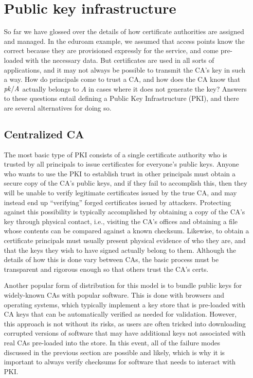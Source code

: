 \documentclass[11pt]{article}
\begin{document}
\section{Public key infrastructure}

So far we have glossed over the details of how certificate authorities
are assigned and managed. In the eduroam example, we assumed that
access points know the correct  because they are
provisioned expressly for the service, and come pre-loaded with the
necessary data. But certificates are used in all sorts of
applications, and it may not always be possible to transmit the CA's
key in such a way. How do principals come to trust a CA, and how does
the CA know that $\mathit{pk/A}$ actually belongs to $A$ in cases where it
does not generate the key? Answers to these questions entail defining
a Public Key Infrastructure (PKI), and there are several
alternatives for doing so.

\subsection{Centralized CA}

The most basic type of PKI consists of a single certificate authority
who is trusted by all principals to issue certificates for everyone's
public keys. Anyone who wants to use the PKI to establish trust in
other principals must obtain a secure copy of the CA's public keys,
and if they fail to accomplish this, then they will be unable to
verify legitimate certificates issued by the true CA, and may instead
end up ``verifying'' forged certificates issued by attackers.
Protecting against this possibility is typically accomplished by
obtaining a copy of the CA's key through physical contact, i.e.,
visiting the CA's offices and obtaining a file whose contents can be
compared against a known checksum. Likewise, to obtain a certificate
principals must usually present physical evidence of who they are, and
that the keys they wish to have signed actually belong to them.
Although the details of how this is done vary between CAs, the basic
process must be transparent and rigorous enough so that others trust
the CA's certs.

Another popular form of distribution for this model is to bundle
public keys for widely-known CAs with popular software. This is done
with browsers and operating systems, which typically implement a key
store that is pre-loaded with CA keys that can be automatically
verified as needed for validation. However, this approach is not
without its risks, as users are often tricked into downloading
corrupted versions of software that may have additional keys not
associated with real CAs pre-loaded into the store. In this event, all
of the failure modes discussed in the previous section are possible
and likely, which is why it is important to always verify checksums
for software that needs to interact with PKI.
\end{document}
